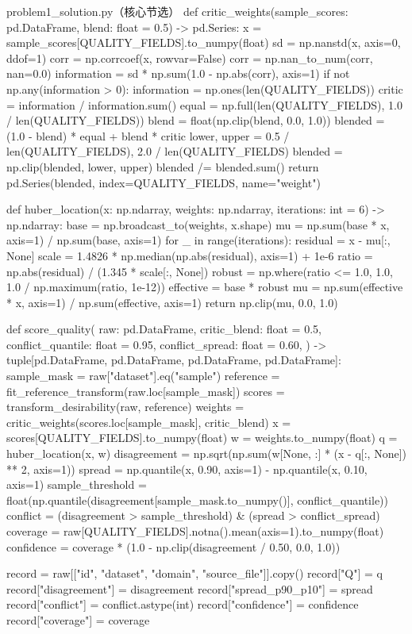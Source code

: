 \documentclass[bwprint]{gmcmthesis}
\numberwithin{equation}{section}
\numberwithin{figure}{section}
\numberwithin{table}{section}
\begin{document}
\begin{Python}{problem1\_solution.py（核心节选）}
def critic_weights(sample_scores: pd.DataFrame, blend: float = 0.5) -> pd.Series:
    x = sample_scores[QUALITY_FIELDS].to_numpy(float)
    sd = np.nanstd(x, axis=0, ddof=1)
    corr = np.corrcoef(x, rowvar=False)
    corr = np.nan_to_num(corr, nan=0.0)
    information = sd * np.sum(1.0 - np.abs(corr), axis=1)
    if not np.any(information > 0):
        information = np.ones(len(QUALITY_FIELDS))
    critic = information / information.sum()
    equal = np.full(len(QUALITY_FIELDS), 1.0 / len(QUALITY_FIELDS))
    blend = float(np.clip(blend, 0.0, 1.0))
    blended = (1.0 - blend) * equal + blend * critic
    lower, upper = 0.5 / len(QUALITY_FIELDS), 2.0 / len(QUALITY_FIELDS)
    blended = np.clip(blended, lower, upper)
    blended /= blended.sum()
    return pd.Series(blended, index=QUALITY_FIELDS, name="weight")


def huber_location(x: np.ndarray, weights: np.ndarray, iterations: int = 6) -> np.ndarray:
    base = np.broadcast_to(weights, x.shape)
    mu = np.sum(base * x, axis=1) / np.sum(base, axis=1)
    for _ in range(iterations):
        residual = x - mu[:, None]
        scale = 1.4826 * np.median(np.abs(residual), axis=1) + 1e-6
        ratio = np.abs(residual) / (1.345 * scale[:, None])
        robust = np.where(ratio <= 1.0, 1.0, 1.0 / np.maximum(ratio, 1e-12))
        effective = base * robust
        mu = np.sum(effective * x, axis=1) / np.sum(effective, axis=1)
    return np.clip(mu, 0.0, 1.0)


def score_quality(
    raw: pd.DataFrame,
    critic_blend: float = 0.5,
    conflict_quantile: float = 0.95,
    conflict_spread: float = 0.60,
) -> tuple[pd.DataFrame, pd.DataFrame, pd.DataFrame, pd.DataFrame]:
    sample_mask = raw["dataset"].eq("sample")
    reference = fit_reference_transform(raw.loc[sample_mask])
    scores = transform_desirability(raw, reference)
    weights = critic_weights(scores.loc[sample_mask], critic_blend)
    x = scores[QUALITY_FIELDS].to_numpy(float)
    w = weights.to_numpy(float)
    q = huber_location(x, w)
    disagreement = np.sqrt(np.sum(w[None, :] * (x - q[:, None]) ** 2, axis=1))
    spread = np.quantile(x, 0.90, axis=1) - np.quantile(x, 0.10, axis=1)
    sample_threshold = float(np.quantile(disagreement[sample_mask.to_numpy()], conflict_quantile))
    conflict = (disagreement > sample_threshold) & (spread > conflict_spread)
    coverage = raw[QUALITY_FIELDS].notna().mean(axis=1).to_numpy(float)
    confidence = coverage * (1.0 - np.clip(disagreement / 0.50, 0.0, 1.0))

    record = raw[["id", "dataset", "domain", "source_file"]].copy()
    record["Q"] = q
    record["disagreement"] = disagreement
    record["spread_p90_p10"] = spread
    record["conflict"] = conflict.astype(int)
    record["confidence"] = confidence
    record["coverage"] = coverage


\end{Python}
\end{document}
